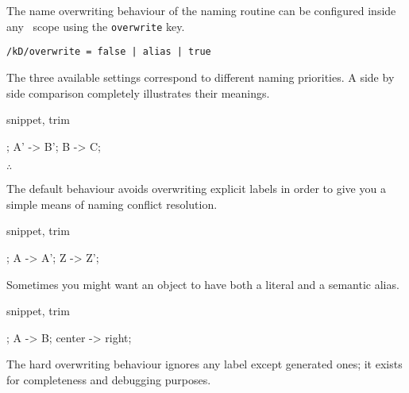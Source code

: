 The name overwriting behaviour of the naming routine can be configured
inside any \koDi\ scope using the \lstinline!overwrite! key.

\begin{lstlisting}
/kD/overwrite = false | alias | true
\end{lstlisting}

The three available settings correspond to different naming priorities.
A side by side comparison completely illustrates their meanings.

\begin{tcblisting}{snippet, trim}
\begin{kodi}
; %
\mor A' -> B';
\mor B  -> C;
\end{kodi}
\end{tcblisting}

\hfill$\therefore$\hfill\null

The default behaviour avoids overwriting explicit labels in order
to give you a simple means of naming conflict resolution.

\begin{tcblisting}{snippet, trim}
\begin{kodi}[golden]
;
\mor A -> A';
\mor Z -> Z';
\end{kodi}
\end{tcblisting}

Sometimes you might want an object to have both a literal and a
semantic alias.

\begin{tcblisting}{snippet, trim}
\begin{kodi}
;
\mor A -> B;
\mor center -> right;
\end{kodi}
\end{tcblisting}

The hard overwriting behaviour ignores any label except generated
ones; it exists for completeness and debugging purposes.
